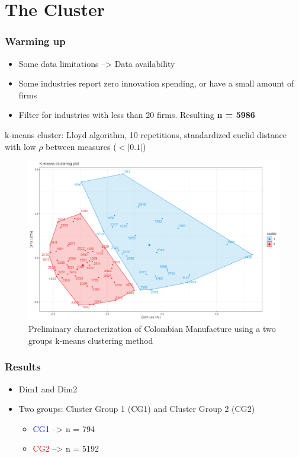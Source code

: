 \documentclass{beamer}
\begin{document}
\section{The Cluster}
	\begin{frame}
		\frametitle{Warming up}
		\begin{itemize}
			\item Some data limitations --> Data availability
			\item Some industries report zero innovation spending, or have a small amount of firms
			\item Filter for industries with less than 20 firms. Resulting \textbf{n = 5986}
		\end{itemize}
	k-means cluster: Lloyd algorithm, 10 repetitions, standardized euclid distance with low $\rho$ between measures ($<|0.1|$)
	\end{frame}
	\begin{frame}
		\begin{figure}[H]	
			\caption{Preliminary characterization of Colombian Manufacture using a two groups k-means clustering method}
			\centering
			\includegraphics[scale = 0.29]{cluster.png}
		\end{figure}
	\end{frame} 
	\begin{frame}
	\frametitle{Results}
	\begin{itemize}
		\item Dim1 and Dim2
		\item Two groups: Cluster Group 1 (CG1) and Cluster Group 2 (CG2)
		\begin{itemize}
			\item \textcolor{blue}{CG1} --> n = 794
			\item \textcolor{red}{CG2}  --> n = 5192
		\end{itemize}
	\end{itemize}
	\end{frame}
\end{document}
